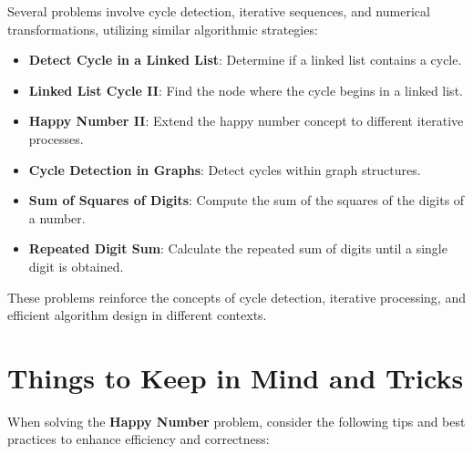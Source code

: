 Several problems involve cycle detection, iterative sequences, and numerical transformations, utilizing similar algorithmic strategies:

\begin{itemize}
    \item \textbf{Detect Cycle in a Linked List}: Determine if a linked list contains a cycle.
    \item \textbf{Linked List Cycle II}: Find the node where the cycle begins in a linked list.
    \item \textbf{Happy Number II}: Extend the happy number concept to different iterative processes.
    \item \textbf{Cycle Detection in Graphs}: Detect cycles within graph structures.
    \item \textbf{Sum of Squares of Digits}: Compute the sum of the squares of the digits of a number.
    \item \textbf{Repeated Digit Sum}: Calculate the repeated sum of digits until a single digit is obtained.
\end{itemize}

These problems reinforce the concepts of cycle detection, iterative processing, and efficient algorithm design in different contexts.

\section*{Things to Keep in Mind and Tricks}

When solving the \textbf{Happy Number} problem, consider the following tips and best practices to enhance efficiency and correctness:

